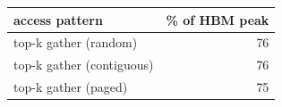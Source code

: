 \begin{tabular}{l r}
\toprule
access pattern & \% of HBM peak \\
\midrule
top-k gather (random) & 76 \\
top-k gather (contiguous) & 76 \\
top-k gather (paged) & 75 \\
\bottomrule
\end{tabular}
